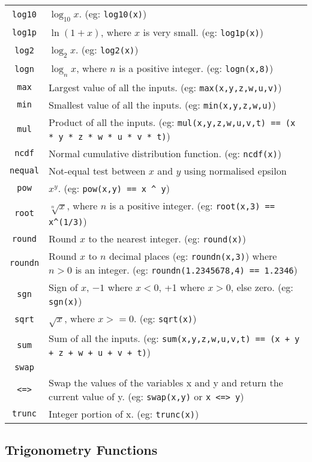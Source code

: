 \begin{tabular}{|c|p{}|}
\verb'log10'& $\log_{10}x$.  (eg: \verb'log10(x)')\\
\verb'log1p'& $\ln (1+x)$, where $x$ is very small. (eg: \verb'log1p(x)')\\
\verb'log2'& $\log_2x$.  (eg: \verb'log2(x)')\\
\verb'logn'& $\log_nx$, where $n$ is a positive integer. (eg: \verb'logn(x,8)')\\
\verb'max'& Largest value of all the inputs. (eg: \verb'max(x,y,z,w,u,v)')\\
\verb'min'& Smallest value of all the inputs. (eg: \verb'min(x,y,z,w,u)')\\
\verb'mul'& Product of all the inputs. (eg: \verb'mul(x,y,z,w,u,v,t) == (x * y * z * w * u * v * t)') \\
\verb'ncdf'& Normal cumulative distribution function.  (eg: \verb'ncdf(x)')\\
\verb'nequal'& Not-equal test between $x$ and $y$ using normalised epsilon\\
\verb'pow'& $x^y$.  (eg: \verb'pow(x,y) == x ^ y')\\
\verb'root'&  $\sqrt[n]{x}$, where $n$ is a positive integer. (eg: \verb'root(x,3) == x^(1/3)')\\
\verb'round'& Round $x$ to the nearest integer.  (eg: \verb'round(x)')\\
\verb'roundn'& Round $x$ to $n$ decimal places  (eg: \verb'roundn(x,3)')
 where $n > 0$ is an integer. (eg: \verb'roundn(1.2345678,4) == 1.2346')\\\verb'sgn'& Sign of $x$, $-1$ where $x < 0$, +1 where $x > 0$, else zero.
 (eg: \verb'sgn(x)')\\
\verb'sqrt'& $\sqrt{x}$, where $x >= 0$.  (eg: \verb'sqrt(x)')\\ 
\verb'sum'& Sum of all the inputs. (eg: \verb'sum(x,y,z,w,u,v,t) == (x + y + z + w + u + v + t)')\\
\verb'swap'\\\verb'<=>'& Swap the values of the variables x and y and return the current value of y.  (eg: \verb'swap(x,y)' or \verb'x <=> y')\\
\verb'trunc'& Integer portion of x.  (eg: \verb'trunc(x)')\\
\hline
\end{tabular}

\subsection{Trigonometry Functions}


